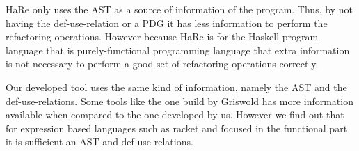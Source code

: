 HaRe only uses the AST as a source of information of the program. Thus, by not having
the def-use-relation or a PDG it has less information to perform the refactoring operations.
However because HaRe is for the Haskell program language that is purely-functional
programming language that extra information is not necessary to perform a good set of
refactoring operations correctly.

Our developed tool uses the same kind of information, namely the AST and the def-use-relations.
Some tools like the one build by Griswold has more information available when compared
to the one developed by us. However we find out that for expression based languages
such as racket and focused in the functional part it is sufficient an AST and
def-use-relations.




